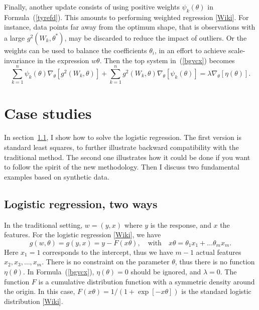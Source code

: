\documentclass[oneside,10pt]{book}
\begin{document}
Finally, another update consists of using positive weights $\psi_k(\theta)$ in Formula~(\ref{tyrefd}). This amounts to performing
 \textcolor{index}{weighted regression} [\href{https://en.wikipedia.org/wiki/Generalized_least_squares#Weighted_least_squares}{Wiki}].
 For instance, data points far away from the optimum shape, that is observations with a large $g^2(W_k,\theta^*)$, may be discarded to reduce the
 impact of outliers. Or the weights can be used to balance the coefficients $\theta_i$, in an effort to achieve scale-invariance in the expression
 $w\theta$.  Then the top system in~(\ref{bgvcx}) becomes
\begin{equation}
 \sum_{k=1}^n \psi_k(\theta)\nabla_\theta [g^2(W_k,\theta)] +\sum_{k=1}^n g^2(W_k,\theta)\nabla_\theta[\psi_k(\theta)]  =\lambda \nabla_\theta [\eta(\theta)].  \label{bgvcx2_1228}
\end{equation}



\section{Case studies}

In section~\ref{2ways}, I show how to solve the logistic regression. The first version is standard least squares, to further illustrate
backward compatibility with the traditional method. The second one illustrates how it could be done if you want to follow the spirit of the new methodology.  Then I discuss two fundamental examples based on synthetic data.

\subsection{Logistic regression, two ways}\label{2ways}

In the traditional setting, $w=(y,x)$ where $y$ is the response, and $x$ the features. For the 
\textcolor{index}{logistic regression}
 [\href{https://en.wikipedia.org/wiki/Logistic_regression}{Wiki}],
we have 
$$
g(w,\theta)=g(y,x)= y-F(x\theta), \quad \text{with } \text{ } x\theta=\theta_1 x_1 + \dots \theta_m x_m.
$$
Here $x_1=1$ corresponds to the intercept, thus we have $m-1$ actual features $x_2,x_3,\dots,x_m$. There is no constraint on the parameter $\theta$,
 thus there is no function $\eta(\theta)$. In Formula~(\ref{bgvcx}), $\eta(\theta)=0$ should be ignored, and $\lambda=0$. The function $F$ is
 a cumulative distribution function with a symmetric density around the origin. In this case, $F(x\theta)=1/(1+\exp[-x\theta])$ is the
  standard \textcolor{index}{logistic distribution} [\href{https://en.wikipedia.org/wiki/Logistic_distribution}{Wiki}].
\end{document}
